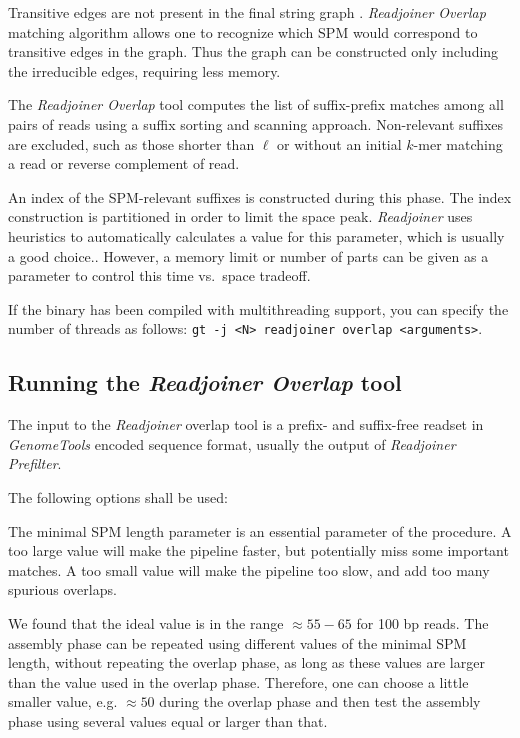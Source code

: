 \documentclass[12pt,titlepage]{article}
\newcommand{\GenomeTools}{\textit{GenomeTools}\xspace}
\newcommand{\Readjoiner}{\textit{Readjoiner}\xspace}
\newcommand{\Rdjprefilter}{\textit{Readjoiner Prefilter}\xspace}
\newcommand{\Rdjoverlap}{\textit{Readjoiner Overlap}\xspace}
\newcommand{\minlen}{\ell}
\begin{document}
Transitive edges are not present in the final string graph \cite{MYE:2005}.
\Rdjoverlap matching algorithm allows one to recognize which SPM would
correspond to transitive edges in the graph. Thus the graph can be constructed
only including the irreducible edges, requiring less memory.

The \Rdjoverlap tool computes the list of suffix-prefix matches among
all pairs of reads using a suffix sorting and scanning approach.
Non-relevant suffixes are excluded, such as those shorter
than $\minlen$ or without an initial $k$-mer matching a read or reverse
complement of read.

An index of the SPM-relevant suffixes is constructed during this phase.
The index construction is partitioned in order to limit the
space peak.
\Readjoiner uses heuristics
to automatically calculates a value for this parameter, which is usually
a good choice..
However, a memory limit or number of parts can be given as a parameter
to control this time vs.\ space tradeoff.

If the binary has been compiled with
multithreading support, you can specify the number of threads as
follows: \texttt{gt -j <N> readjoiner overlap <arguments>}.

\subsection{Running the \Rdjoverlap tool}

The input to the \Readjoiner overlap tool is a prefix- and suffix-free readset
in \GenomeTools encoded sequence format, usually the output of \Rdjprefilter.

The following options shall be used:

\begin{Justshowoptions}
\end{Justshowoptions}

The minimal SPM length parameter is an essential parameter of the procedure.
A too large value will make the pipeline faster, but potentially miss some
important matches. A too small value will make the pipeline too slow, and add
too many spurious overlaps.

We found that the ideal value is in the range
$\approx 55-65$ for 100 bp reads. The assembly phase can be repeated using
different values of the minimal SPM length, without repeating the overlap phase,
as long as these values are larger than the value used in the overlap phase.
Therefore, one can choose a little smaller value, e.g. $\approx 50$ during
the overlap phase and then test the assembly phase using several values
equal or larger than that.
\end{document}
